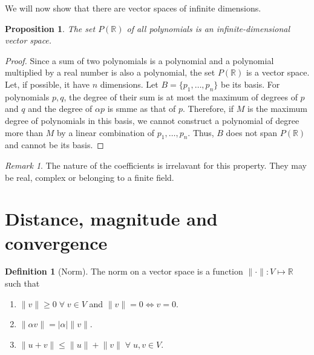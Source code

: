\documentclass{article}
\theoremstyle{plain}
\numberwithin{thm}{section}
\theoremstyle{plain}
\newtheorem{prop}{Proposition}
\numberwithin{prop}{section}
\theoremstyle{definition}
\newtheorem{defn}{Definition}
\numberwithin{defn}{section}
\theoremstyle{remark}
\newtheorem*{rem}{Remark}
\numberwithin{equation}{section}
\begin{document}
We will now show that there are vector spaces of infinite dimensions.
\begin{prop}\label{s1p4}
The set $P(\mathbb{R})$ of all polynomials is an infinite-dimensional vector 
space.
\end{prop}
\begin{proof}
Since a sum of two polynomials is a polynomial and a polynomial multiplied by a
real number is also a polynomial, the set $P(\mathbb{R})$ is a vector space. 
Let, if possible, it have $n$ dimensions. Let $B = \{p_1, \ldots, p_n\}$ be its
basis. For polynomials $p, q$, the degree of their sum is at most the maximum of
degrees of $p$ and $q$ and the degree of $\alpha p$ is smme as that of $p$.
Therefore, if $M$ is the maximum degree of polynomials in this basis, we cannot
construct a polynomial of degree more than $M$ by a linear combination of $p_1,
\ldots, p_n$. Thus, $B$ does not span $P(\mathbb{R})$ and cannot be its basis.
\end{proof}
\begin{rem}
The nature of the coefficients is irrelavant for this property. They may be
real, complex or belonging to a finite field.
\end{rem}

\section{Distance, magnitude and convergence}\label{s2}
\begin{defn}[Norm]\label{s2d1}
The norm on a vector space is a function $\lVert\cdot\rVert:V\mapsto\mathbb{R}$
such that
\begin{enumerate}
\item $\lVert v \rVert \ge 0 \;\forall\; v \in V$ and $\lVert v \rVert = 0
\Leftrightarrow v = 0$.
\item $\lVert \alpha v\rVert = |\alpha|\lVert v \rVert$.
\item $\lVert u + v\rVert \le \lVert u \rVert + \lVert v \rVert\;\forall\; u, v
\in V$.
\end{enumerate}
\end{defn}
\end{document}
